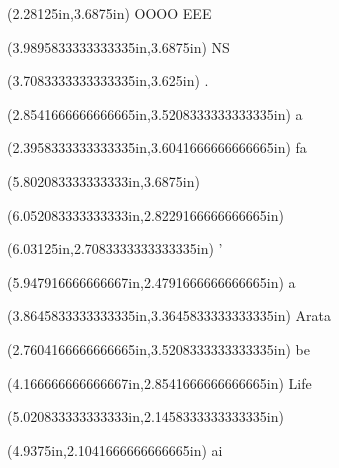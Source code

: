 \documentclass{article}
\begin{document}
\begin{textblock*}{8.0in}(2.28125in,3.6875in)
\fontsize{3.00}{3.60}\selectfont
OOOO EEE
\end{textblock*}
\begin{textblock*}{8.0in}(3.9895833333333335in,3.6875in)
\fontsize{8.25}{9.90}\selectfont
NS
\end{textblock*}
\begin{textblock*}{8.0in}(3.7083333333333335in,3.625in)
\fontsize{5.25}{6.30}\selectfont
.
\end{textblock*}
\begin{textblock*}{8.0in}(2.8541666666666665in,3.5208333333333335in)
\fontsize{2.25}{2.70}\selectfont
a
\end{textblock*}
\begin{textblock*}{8.0in}(2.3958333333333335in,3.6041666666666665in)
\fontsize{35.25}{42.30}\selectfont
fa
\end{textblock*}
\begin{textblock*}{8.0in}(5.802083333333333in,3.6875in)
\fontsize{60.00}{72.00}
\end{textblock*}
\begin{textblock*}{8.0in}(6.052083333333333in,2.8229166666666665in)
\fontsize{6.00}{7.20}
\end{textblock*}
\begin{textblock*}{8.0in}(6.03125in,2.7083333333333335in)
\fontsize{9.75}{11.70}\selectfont
'
\end{textblock*}
\begin{textblock*}{8.0in}(5.947916666666667in,2.4791666666666665in)
\fontsize{7.50}{9.00}\selectfont
a
\end{textblock*}
\begin{textblock*}{8.0in}(3.8645833333333335in,3.3645833333333335in)
\fontsize{72.00}{86.40}\selectfont
Arata
\end{textblock*}
\begin{textblock*}{8.0in}(2.7604166666666665in,3.5208333333333335in)
\fontsize{88.50}{106.20}\selectfont
be
\end{textblock*}
\begin{textblock*}{8.0in}(4.166666666666667in,2.8541666666666665in)
\fontsize{41.25}{49.50}\selectfont
Life
\end{textblock*}
\begin{textblock*}{8.0in}(5.020833333333333in,2.1458333333333335in)
\fontsize{1.50}{1.80}
\end{textblock*}
\begin{textblock*}{8.0in}(4.9375in,2.1041666666666665in)
\fontsize{0.75}{0.90}\selectfont
 ai
\end{textblock*}
\end{document}
